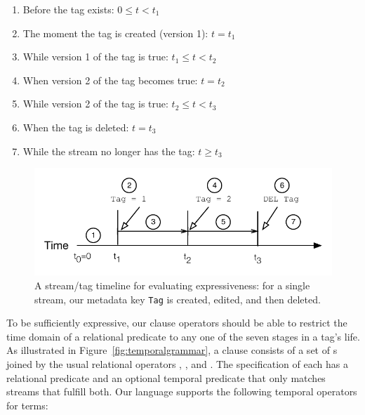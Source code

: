 \begin{enumerate}
\item Before the tag exists: $0 \leq t < t_1$
\item The moment the tag is created (version 1): $t = t_1$
\item While version 1 of the tag is true: $t_1 \leq t < t_2$
\item When version 2 of the tag becomes true: $t = t_2$
\item While version 2 of the tag is true: $t_2 \leq t < t_3$
\item When the tag is deleted: $t = t_3$
\item While the stream no longer has the tag: $t \geq t_3$
\end{enumerate}

\begin{figure}
\centering
\includegraphics[width=.9\linewidth]{figs/expressivemodel.pdf}
\caption{A stream/tag timeline for evaluating expressiveness: for a single stream, our metadata key \texttt{Tag} is
created, edited, and then deleted.}
\label{fig:expressivemodel}
\end{figure}

To be sufficiently expressive, our  clause operators should be
able to restrict the time domain of a relational predicate to any one of the
seven stages in a tag's life. As illustrated in
Figure~\ref{fig:temporalgrammar}, a  clause consists of a set
of s joined by the usual relational operators
, , and .  The specification of each
 has a relational predicate and an optional temporal
predicate that only matches streams that fulfill both.
Our language supports the following temporal operators for  terms:

